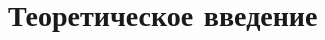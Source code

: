 \documentclass{../../text-style}
\begin{document}
\maketitle
\thispagestyle{empty}

\section{Теоретическое введение}
\end{document}
